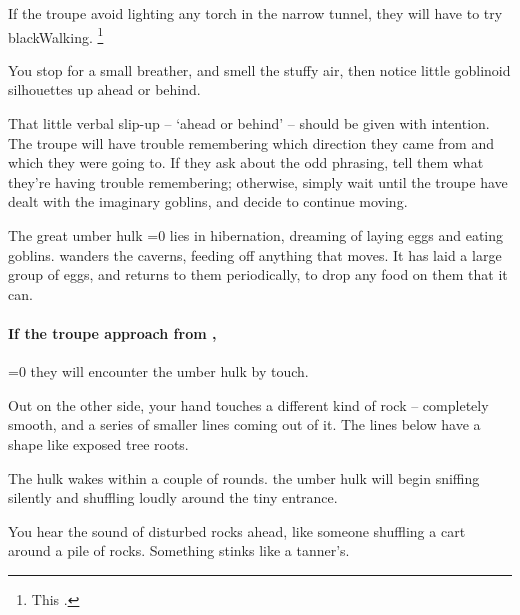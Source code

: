 \begin{multicols}{2}
If the troupe avoid lighting any torch in the narrow tunnel, they will have to try \gls{blackWalking}.%
\footnote{This .}

\begin{boxtext}
  You stop for a small breather, and smell the stuffy air, then notice little goblinoid silhouettes up ahead or behind.
\end{boxtext}

That little verbal slip-up -- `ahead or behind' -- should be given with intention.
The troupe will have trouble remembering which direction they came from and which they were going to.
If they ask about the odd phrasing, tell them what they're having trouble remembering; otherwise, simply wait until the troupe have dealt with the imaginary goblins, and decide to continue moving.



\begin{exampletext}
  The great umber hulk%
  \ifnum\value{temperature}=0
    lies in hibernation, dreaming of laying eggs and eating goblins.
  \else
    wanders the caverns, feeding off anything that moves.
    It has laid a large group of eggs, and returns to them periodically, to drop any food on them that it can.
  \fi
\end{exampletext}

\paragraph{If the troupe approach from ,}
\ifnum\value{temperature}=0
  they will encounter the umber hulk by touch.

  \begin{boxtext}
    Out on the other side, your hand touches a different kind of rock -- completely smooth, and a series of smaller lines coming out of it.
    The lines below have a shape like exposed tree roots.
  \end{boxtext}

  The hulk wakes within a couple of \glspl{round}.
\else
  the umber hulk will begin sniffing silently and shuffling loudly around the tiny entrance.

  \begin{boxtext}
    You hear the sound of disturbed rocks ahead, like someone shuffling a cart around a pile of rocks.
    Something stinks like a tanner's.
  \end{boxtext}
\fi


\end{multicols}
